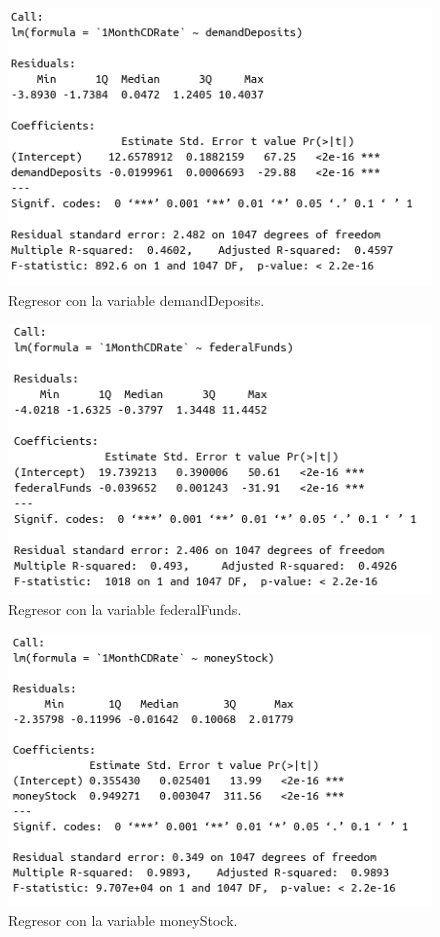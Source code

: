 \documentclass[12pt,a4paper]{article}
\begin{document}
\begin{figure}[H]
	\centering 
	\includegraphics[scale=0.55]{./Imagenes/Regresion/regresor_1va9.png}
	\caption{Regresor con la variable demandDeposits.}
\end{figure}

\begin{figure}[H]
	\centering 
	\includegraphics[scale=0.55]{./Imagenes/Regresion/regresor_1va10.png}
	\caption{Regresor con la variable federalFunds.}
\end{figure}

\begin{figure}[H]
	\centering 
	\includegraphics[scale=0.55]{./Imagenes/Regresion/regresor_1va11.png}
	\caption{Regresor con la variable moneyStock.}
\end{figure}
\end{document}

